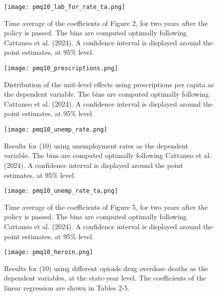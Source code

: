 \documentclass[12pt,a4paper]{article}
\begin{document}
\newpage

\begin{figure}[htbp]
    \centering
    \texttt{[image: pmq10\_lab\_for\_rate\_ta.png]}
    \caption{Time average of the coefficients of Figure 2, for two years after the policy is passed. The bins are computed optimally following Cattaneo et al. (2024). A confidence interval is displayed around the point estimates, at 95\% level.}
    \label{fig:lab_for_rate_ta}
\end{figure}

\newpage

\begin{figure}[htbp]
    \centering
    \texttt{[image: pmq10\_prescriptions.png]}
    \caption{Distribution of the unit-level effects using prescriptions per capita as the dependent variable. The bins are computed optimally following Cattaneo et al. (2024). A confidence interval is displayed around the point estimates, at 95\% level.}
    \label{fig:prescriptions}
\end{figure}

\newpage

\begin{figure}[htbp]
    \centering
    \texttt{[image: pmq10\_unemp\_rate.png]}
    \caption{Results for (10) using unemployment rates as the dependent variable. The bins are computed optimally following Cattaneo et al. (2024). A confidence interval is displayed around the point estimates, at 95\% level.}
    \label{fig:unemp_rate}
\end{figure}

\newpage

\begin{figure}[htbp]
    \centering
    \texttt{[image: pmq10\_unemp\_rate\_ta.png]}
    \caption{Time average of the coefficients of Figure 5, for two years after the policy is passed. The bins are computed optimally following Cattaneo et al. (2024). A confidence interval is displayed around the point estimates, at 95\% level.}
    \label{fig:unemp_rate_ta}
\end{figure}

\newpage

\begin{figure}[htbp]
    \centering
    \texttt{[image: pmq10\_heroin.png]}
    \caption{Results for (10) using different opioids drug overdose deaths as the dependent variables, at the state-year level. The coefficients of the linear regression are shown in Tables 2-5.}
    \label{fig:drugs}
\end{figure}
\end{document}
